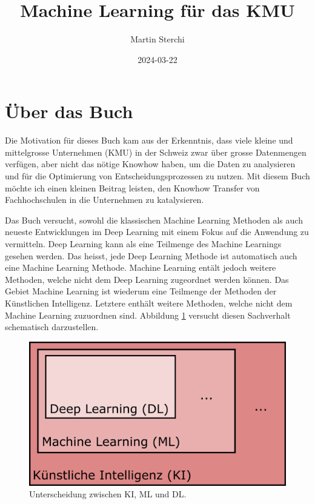 \documentclass[
]{book}
\title{Machine Learning für das KMU}
\author{Martin Sterchi}
\date{2024-03-22}
\begin{document}
\maketitle

{
\setcounter{tocdepth}{1}
\tableofcontents
}
\hypertarget{uxfcber-das-buch}{%
\chapter*{Über das Buch}\label{uxfcber-das-buch}}

Die Motivation für dieses Buch kam aus der Erkenntnis, dass viele kleine und mittelgrosse Unternehmen (KMU) in der Schweiz zwar über grosse Datenmengen verfügen, aber nicht das nötige Knowhow haben, um die Daten zu analysieren und für die Optimierung von Entscheidungsprozessen zu nutzen. Mit diesem Buch möchte ich einen kleinen Beitrag leisten, den Knowhow Transfer von Fachhochschulen in die Unternehmen zu katalysieren.

Das Buch versucht, sowohl die klassischen Machine Learning Methoden als auch neueste Entwicklungen im Deep Learning mit einem Fokus auf die Anwendung zu vermitteln. Deep Learning kann als eine Teilmenge des Machine Learnings gesehen werden. Das heisst, jede Deep Learning Methode ist automatisch auch eine Machine Learning Methode. Machine Learning entält jedoch weitere Methoden, welche nicht dem Deep Learning zugeordnet werden können. Das Gebiet Machine Learning ist wiederum eine Teilmenge der Methoden der Künstlichen Intelligenz. Letztere enthält weitere Methoden, welche nicht dem Machine Learning zuzuordnen sind. Abbildung \ref{fig:kimldl} versucht diesen Sachverhalt schematisch darzustellen.

\begin{figure}

{\centering \includegraphics[width=0.6\linewidth]{images/KI_ML_DL} 

}

\caption{Unterscheidung zwischen KI, ML und DL. }\label{fig:kimldl}
\end{figure}
\end{document}
